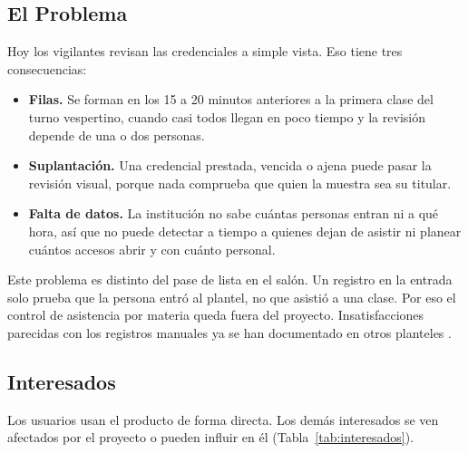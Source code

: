 \subsection{El Problema}
Hoy los vigilantes revisan las credenciales a simple vista. Eso tiene tres
consecuencias:
\begin{itemize}
	\item \textbf{Filas.} Se forman en los 15 a 20 minutos anteriores a la
	      primera clase del turno vespertino, cuando casi todos llegan en poco tiempo
	      y la revisión depende de una o dos personas.
	\item \textbf{Suplantación.} Una credencial prestada, vencida o ajena puede
	      pasar la revisión visual, porque nada comprueba que quien la muestra sea su
	      titular.
	\item \textbf{Falta de datos.} La institución no sabe cuántas personas entran
	      ni a qué hora, así que no puede detectar a tiempo a quienes dejan de asistir
	      ni planear cuántos accesos abrir y con cuánto personal.
\end{itemize}
Este problema es distinto del pase de lista en el salón. Un registro en la
entrada solo prueba que la persona entró al plantel, no que asistió a una
clase. Por eso el control de asistencia por materia queda fuera del proyecto.
Insatisfacciones parecidas con los registros manuales ya se han documentado en
otros planteles \parencite{torres2019qr}.

\subsection{Interesados}
Los usuarios usan el producto de forma directa. Los demás interesados se ven
afectados por el proyecto o pueden influir en él (Tabla~\ref{tab:interesados}).


